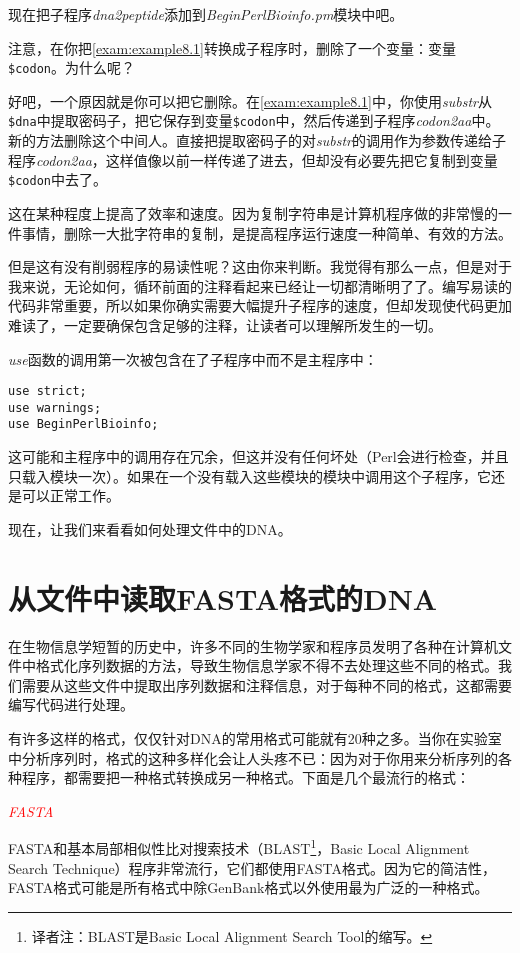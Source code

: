 现在把子程序\textit{dna2peptide}添加到\textit{BeginPerlBioinfo.pm}模块中吧。

注意，在你把\autoref{exam:example8.1}转换成子程序时，删除了一个变量：变量\verb|$codon|。为什么呢？

好吧，一个原因就是你可以把它删除。在\autoref{exam:example8.1}中，你使用\textit{substr}从\verb|$dna|中提取密码子，把它保存到变量\verb|$codon|中，然后传递到子程序\textit{codon2aa}中。新的方法删除这个中间人。直接把提取密码子的对\textit{substr}的调用作为参数传递给子程序\textit{codon2aa}，这样值像以前一样传递了进去，但却没有必要先把它复制到变量\verb|$codon|中去了。

这在某种程度上提高了效率和速度。因为复制字符串是计算机程序做的非常慢的一件事情，删除一大批字符串的复制，是提高程序运行速度一种简单、有效的方法。

但是这有没有削弱程序的易读性呢？这由你来判断。我觉得有那么一点，但是对于我来说，无论如何，循环前面的注释看起来已经让一切都清晰明了了。编写易读的代码非常重要，所以如果你确实需要大幅提升子程序的速度，但却发现使代码更加难读了，一定要确保包含足够的注释，让读者可以理解所发生的一切。

\textit{use}函数的调用第一次被包含在了子程序中而不是主程序中：

\begin{lstlisting}
use strict;
use warnings;
use BeginPerlBioinfo;
\end{lstlisting}

这可能和主程序中的调用存在冗余，但这并没有任何坏处（Perl会进行检查，并且只载入模块一次）。如果在一个没有载入这些模块的模块中调用这个子程序，它还是可以正常工作。

现在，让我们来看看如何处理文件中的DNA。

\section{从文件中读取FASTA格式的DNA}
在生物信息学短暂的历史中，许多不同的生物学家和程序员发明了各种在计算机文件中格式化序列数据的方法，导致生物信息学家不得不去处理这些不同的格式。我们需要从这些文件中提取出序列数据和注释信息，对于每种不同的格式，这都需要编写代码进行处理。

有许多这样的格式，仅仅针对DNA的常用格式可能就有20种之多。当你在实验室中分析序列时，格式的这种多样化会让人头疼不已：因为对于你用来分析序列的各种程序，都需要把一种格式转换成另一种格式。下面是几个最流行的格式：

\textcolor{red}{\textit{FASTA}}
\begin{adjustwidth}{1cm}{}
FASTA和基本局部相似性比对搜索技术（BLAST\footnote{译者注：BLAST是Basic Local Alignment Search Tool的缩写。}，Basic Local Alignment Search Technique）程序非常流行，它们都使用FASTA格式。因为它的简洁性，FASTA格式可能是所有格式中除GenBank格式以外使用最为广泛的一种格式。
\end{adjustwidth}

